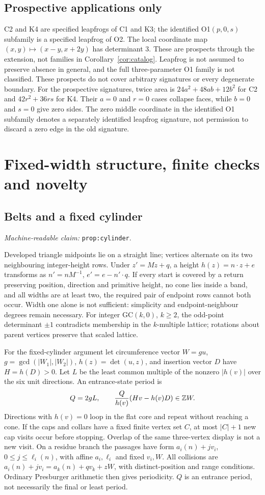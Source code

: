 \documentclass[11pt]{amsart}
\newcommand{\Z}{\mathbb Z}
\newcommand{\record}[1]{\nolinkurl{#1}}
\newcommand{\claimid}[1]{\par\nopagebreak\noindent\textit{Machine-readable claim:} \record{#1}.\par}
\theoremstyle{definition}\newtheorem{definition}{Definition}
\begin{document}
\subsection{Prospective applications only}
C2 and K4 are specified leapfrogs of C1 and K3; the identified O1$(p,0,s)$
subfamily is a specified leapfrog of O2. The local coordinate map
$(x,y)\mapsto(x-y,x+2y)$ has determinant 3. These are prospects through
the extension, not families in Corollary~\ref{cor:catalog}. Leapfrog
is not assumed to preserve absence in general, and the full
three-parameter O1 family is not classified. These prospects do not
cover arbitrary signatures or every degenerate boundary. For the prospective signatures, twice area is $24a^2+48ab+12b^2$ for C2 and $42r^2+36rs$ for K4. Their $a=0$ and $r=0$ cases collapse faces, while $b=0$ and $s=0$ give zero sides. The zero middle coordinate in the identified O1 subfamily denotes a separately identified leapfrog signature, not permission to discard a zero edge in the old signature.

\section{Fixed-width structure, finite checks and novelty}\label{sec:evidence}
\subsection{Belts and a fixed cylinder}\label{prop:cylinder}
\claimid{prop:cylinder}
Developed triangle midpoints lie on a straight line; vertices alternate
on its two neighbouring integer-height rows. Under $z'=Mz+q$, a height
$h(z)=n\cdot z+e$ transforms as $n'=nM^{-1}$,
$e'=e-n'\cdot q$. If every start is covered by a return preserving
position, direction and primitive height, no cone lies inside a band,
and all widths are at least two, the required pair of endpoint rows
cannot both occur. Width one alone is not sufficient: simplicity and
endpoint-neighbour degrees remain necessary. For integer GC$(k,0)$,
$k\ge2$, the odd-point determinant $\pm1$ contradicts membership in
the $k$-multiple lattice; rotations about parent vertices preserve that
scaled lattice.

For the fixed-cylinder argument let circumference vector $W=gu$,
$g=\gcd(|W_1|,|W_2|)$, $h(z)=\det(u,z)$, and insertion vector $D$
have $H=h(D)>0$. Let $L$ be the least common multiple of the nonzero
$|h(v)|$ over the six unit directions. An entrance-state period is
\begin{equation}\label{eq:cylinder}
 Q=2gL,\qquad {Q\over h(v)}(Hv-h(v)D)\in\Z W.
\end{equation}
Directions with $h(v)=0$ loop in the flat core and repeat without
reaching a cone. If the caps and collars have a fixed finite vertex
set $C$, at most $|C|+1$ new cap visits occur before stopping. Overlap
of the same three-vertex display is not a new visit. On a residue
branch the passages have form $a_i(n)+jv_i$, $0\le j\le\ell_i(n)$,
with affine $a_i,\ell_i$ and fixed $v_i,W$. All collisions are
$a_i(n)+jv_i=a_k(n)+qv_k+zW$, with distinct-position and range
conditions. Ordinary Presburger arithmetic then gives periodicity.
$Q$ is an entrance period, not necessarily the final or least period.
\end{document}
